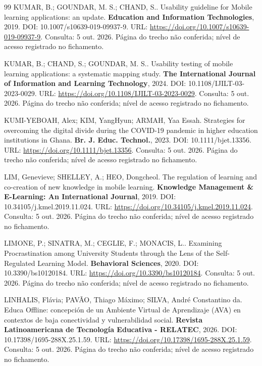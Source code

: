 \begin{thebibliography}{99}
 KUMAR, B.; GOUNDAR, M. S.; CHAND, S.. Usability guideline for Mobile learning applications: an update. \textbf{Education and Information Technologies}, 2019. DOI: 10.1007/s10639-019-09937-9. URL: \url{https://doi.org/10.1007/s10639-019-09937-9}. Consulta: 5 out. 2026. Página do trecho não conferida; nível de acesso registrado no fichamento.

 KUMAR, B.; CHAND, S.; GOUNDAR, M. S.. Usability testing of mobile learning applications: a systematic mapping study. \textbf{The International Journal of Information and Learning Technology}, 2024. DOI: 10.1108/IJILT-03-2023-0029. URL: \url{https://doi.org/10.1108/IJILT-03-2023-0029}. Consulta: 5 out. 2026. Página do trecho não conferida; nível de acesso registrado no fichamento.

 KUMI-YEBOAH, Alex; KIM, YangHyun; ARMAH, Yaa Essah. Strategies for overcoming the digital divide during the COVID-19 pandemic in higher education institutions in Ghana. \textbf{Br. J. Educ. Technol.}, 2023. DOI: 10.1111/bjet.13356. URL: \url{https://doi.org/10.1111/bjet.13356}. Consulta: 5 out. 2026. Página do trecho não conferida; nível de acesso registrado no fichamento.

 LIM, Genevieve; SHELLEY, A.; HEO, Dongcheol. The regulation of learning and co-creation of new knowledge in mobile learning. \textbf{Knowledge Management \& E-Learning: An International Journal}, 2019. DOI: 10.34105/j.kmel.2019.11.024. URL: \url{https://doi.org/10.34105/j.kmel.2019.11.024}. Consulta: 5 out. 2026. Página do trecho não conferida; nível de acesso registrado no fichamento.

 LIMONE, P.; SINATRA, M.; CEGLIE, F.; MONACIS, L.. Examining Procrastination among University Students through the Lens of the Self-Regulated Learning Model. \textbf{Behavioral Sciences}, 2020. DOI: 10.3390/bs10120184. URL: \url{https://doi.org/10.3390/bs10120184}. Consulta: 5 out. 2026. Página do trecho não conferida; nível de acesso registrado no fichamento.

 LINHALIS, Flávia; PAVÃO, Thiago Máximo; SILVA, André Constantino da. Educa Offline: concepción de un Ambiente Virtual de Aprendizaje (AVA) en contextos de baja conectividad y vulnerabilidad social. \textbf{Revista Latinoamericana de Tecnología Educativa - RELATEC}, 2026. DOI: 10.17398/1695-288X.25.1.59. URL: \url{https://doi.org/10.17398/1695-288X.25.1.59}. Consulta: 5 out. 2026. Página do trecho não conferida; nível de acesso registrado no fichamento.


\end{thebibliography}
